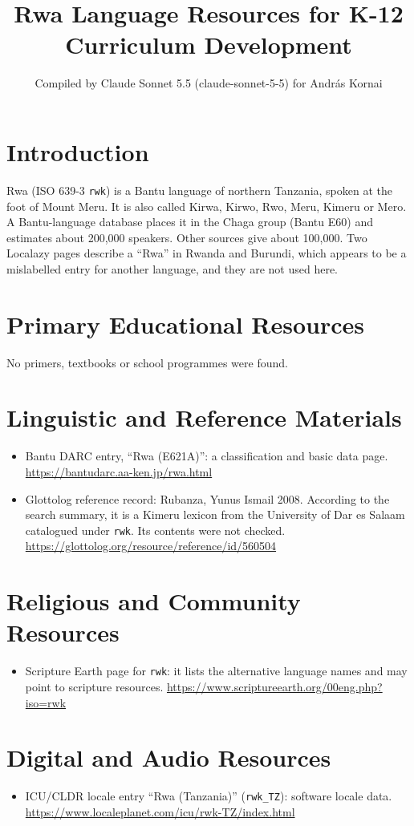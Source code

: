 \documentclass[12pt]{article}
\title{Rwa Language Resources for K-12 Curriculum Development}
\author{Compiled by Claude Sonnet 5.5 (claude-sonnet-5-5) for Andr\'as Kornai}
\date{}
\begin{document}
\maketitle

\section{Introduction}
Rwa (ISO 639-3 \texttt{rwk}) is a Bantu language of northern Tanzania, spoken at the foot of Mount Meru. It is also called Kirwa, Kirwo, Rwo, Meru, Kimeru or Mero. A Bantu-language database places it in the Chaga group (Bantu E60) and estimates about 200,000 speakers. Other sources give about 100,000. Two Localazy pages describe a ``Rwa'' in Rwanda and Burundi, which appears to be a mislabelled entry for another language, and they are not used here.

\section{Primary Educational Resources}
No primers, textbooks or school programmes were found.

\section{Linguistic and Reference Materials}
\begin{itemize}
\item Bantu DARC entry, ``Rwa (E621A)'': a classification and basic data page. \url{https://bantudarc.aa-ken.jp/rwa.html}
\item Glottolog reference record: Rubanza, Yunus Ismail 2008. According to the search summary, it is a Kimeru lexicon from the University of Dar es Salaam catalogued under \texttt{rwk}. Its contents were not checked. \url{https://glottolog.org/resource/reference/id/560504}
\end{itemize}

\section{Religious and Community Resources}
\begin{itemize}
\item Scripture Earth page for \texttt{rwk}: it lists the alternative language names and may point to scripture resources. \url{https://www.scriptureearth.org/00eng.php?iso=rwk}
\end{itemize}

\section{Digital and Audio Resources}
\begin{itemize}
\item ICU/CLDR locale entry ``Rwa (Tanzania)'' (\texttt{rwk\_TZ}): software locale data. \url{https://www.localeplanet.com/icu/rwk-TZ/index.html}
\end{itemize}
\end{document}
